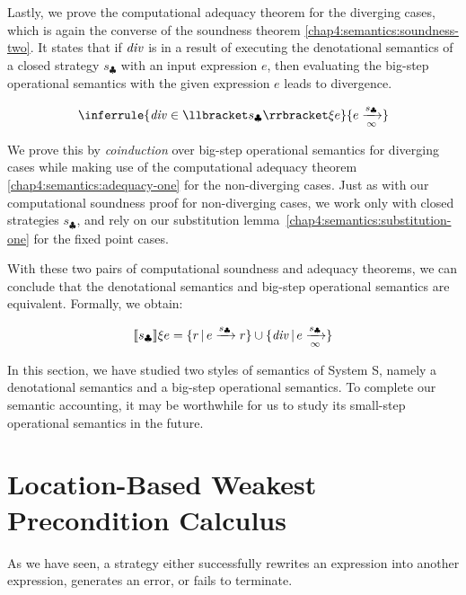 Lastly, we prove the computational adequacy theorem for the diverging cases, which is again the converse of the soundness theorem \ref{chap4:semantics:soundness-two}. It states that if $\mathit{div}$ is in a result of executing the denotational semantics of a closed strategy $s_\clubsuit$ with an input expression $e$, then evaluating the big-step operational semantics with the given expression $e$ leads to divergence.

\begin{theorem}
    \begin{align*}
    \inferrule{\dive \in \llbracket s_\clubsuit \rrbracket \xi e}{e \xrightarrow[\infty]{s_\clubsuit}}
    \end{align*}
\label{chap4:semantics:adequacy-two}
\vspace{-1.5em}
\end{theorem}
We prove this by \emph{coinduction} over big-step operational semantics for diverging cases while making use of the computational adequacy theorem \ref{chap4:semantics:adequacy-one} for the non-diverging cases. Just as with our computational soundness proof for non-diverging cases, we work only with closed strategies $s_\clubsuit$, and rely on our substitution lemma~\ref{chap4:semantics:substitution-one} for the fixed point cases.

With these two pairs of computational soundness and adequacy theorems, we can conclude that the denotational semantics and big-step operational semantics are equivalent. Formally, we obtain:
\begin{theorem}
    \begin{align*}
    \llbracket s_\clubsuit\rrbracket \xi e =
    \{r \,|\, e \xrightarrow[]{s_\clubsuit} r \} \cup
     \{\mathit{div} \,|\, e \xrightarrow[\infty]{s_\clubsuit}\}
    \end{align*}
\label{chap4:semantics:equiv}
\vspace{-1.5em}
\end{theorem}
In this section, we have studied two styles of semantics of System S, namely a denotational semantics and a big-step operational semantics. To complete our semantic accounting, it may be worthwhile for us to study its small-step operational semantics in the future.

\section{Location-Based Weakest Precondition Calculus}
\label{chap4:wp}
As we have seen, a strategy either successfully rewrites an expression into another expression, generates an error, or fails to terminate.

